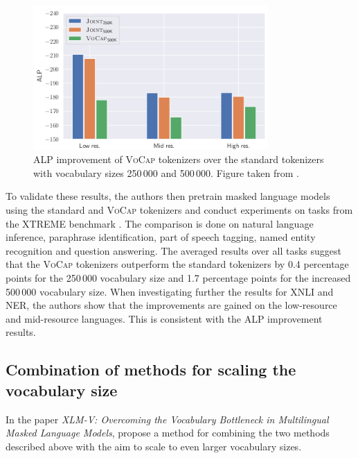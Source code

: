 \begin{figure}
    \centering
    \includegraphics[width=0.8\textwidth]{img/temp/alp_improvement.png}
    \caption{ALP improvement of \textsc{VoCap} tokenizers over the standard tokenizers with vocabulary sizes 250\,000 and 500\,000. Figure taken from \cite{zheng_allocating_2021}.}
    \label{fig:alp_improvement}
\end{figure}

To validate these results, the authors then pretrain masked language models using the standard and \textsc{VoCap} tokenizers and conduct experiments on tasks from the XTREME benchmark \cite{hu_xtreme_nodate}. The comparison is done on natural language inference, paraphrase identification, part of speech tagging, named entity recognition and question answering. The averaged results over all tasks suggest that the \textsc{VoCap} tokenizers outperform the standard tokenizers by 0.4 percentage points for the 250\,000 vocabulary size and 1.7 percentage points for the increased 500\,000 vocabulary size. When investigating further the results for XNLI and NER, the authors show that the improvements are gained on the low-resource and mid-resource languages. This is consistent with the ALP improvement results.



\subsection{Combination of methods for scaling the vocabulary size}

In the paper \textit{XLM-V: Overcoming the Vocabulary Bottleneck in Multilingual Masked Language Models}, \citeauthor{liang_xlm-v_2023} propose a method for combining the two methods described above with the aim to scale to even larger vocabulary sizes. 

